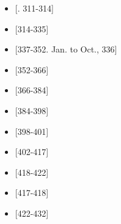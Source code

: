 \begin{itemize}
\item {} [. 311-314]
\end{itemize}

\begin{itemize}
\item {} [314-335]
\end{itemize}

\begin{itemize}
\item {} [337-352.  Jan. to Oct., 336]
\end{itemize}

\begin{itemize}
\item {} [352-366]
\end{itemize}

\begin{itemize}
\item {} [366-384]
\end{itemize}

\begin{itemize}
\item {} [384-398]
\end{itemize}

\begin{itemize}
\item {} [398-401]
\end{itemize}

\begin{itemize}
\item {} [402-417]
\end{itemize}

\begin{itemize}
\item {} [418-422]
\end{itemize}

\begin{itemize}
\item {} [417-418]
\end{itemize}

\begin{itemize}
\item {} [422-432]
\end{itemize}

